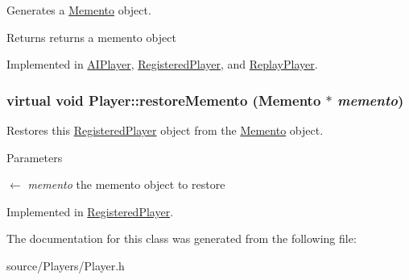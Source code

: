 Generates a \hyperlink{classMemento}{Memento} object. \begin{DoxyReturn}{Returns}
returns a memento object 
\end{DoxyReturn}


Implemented in \hyperlink{classAIPlayer_a83d0865c5869bbf02a66207976842de6}{AIPlayer}, \hyperlink{classRegisteredPlayer_ab9436dac85b13fe2ad6849eb4efb02b8}{RegisteredPlayer}, and \hyperlink{classReplayPlayer_a9301be927a78f52b14602f6660ce35c4}{ReplayPlayer}.\hypertarget{classPlayer_a9c4f1a1eef2fbfda4b6e19e97be91877}{
\subsubsection[{restoreMemento}]{\setlength{\rightskip}{0pt plus 5cm}virtual void Player::restoreMemento ({\bf Memento} $\ast$ {\em memento})}}
\label{classPlayer_a9c4f1a1eef2fbfda4b6e19e97be91877}


Restores this \hyperlink{classRegisteredPlayer}{RegisteredPlayer} object from the \hyperlink{classMemento}{Memento} object. 
\begin{DoxyParams}{Parameters}
\item[\mbox{$\leftarrow$} {\em memento}]the memento object to restore \end{DoxyParams}


Implemented in \hyperlink{classRegisteredPlayer_a2a588dca8f68c5d72b4f73312f017c4d}{RegisteredPlayer}.

The documentation for this class was generated from the following file:\begin{DoxyCompactItemize}
\item 
source/Players/Player.h\end{DoxyCompactItemize}
